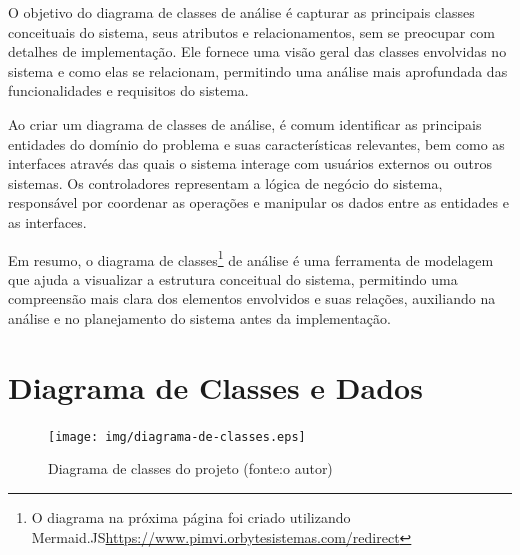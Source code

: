 \documentclass[
	12pt,				%
	openright,			%
	twoside,			%
	a4paper,			%
	english,			%
	brazil				%
	]{abntex2}
\begin{document}
O objetivo do diagrama de classes de análise é capturar as principais classes conceituais do sistema, seus atributos e relacionamentos, sem se preocupar com detalhes de implementação. Ele fornece uma visão geral das classes envolvidas no sistema e como elas se relacionam, permitindo uma análise mais aprofundada das funcionalidades e requisitos do sistema.

Ao criar um diagrama de classes de análise, é comum identificar as principais entidades do domínio do problema e suas características relevantes, bem como as interfaces através das quais o sistema interage com usuários externos ou outros sistemas. Os controladores representam a lógica de negócio do sistema, responsável por coordenar as operações e manipular os dados entre as entidades e as interfaces.

Em resumo, o diagrama de classes\footnote{O diagrama na próxima página foi criado utilizando Mermaid.JS\url{https://www.pimvi.orbytesistemas.com/redirect}} de análise é uma ferramenta de modelagem que ajuda a visualizar a estrutura conceitual do sistema, permitindo uma compreensão mais clara dos elementos envolvidos e suas relações, auxiliando na análise e no planejamento do sistema antes da implementação.

\clearpage

\section{Diagrama de Classes e Dados}\label{diagrama_de_classes}

\begin{figure}[htb] %
	\centering
	\texttt{[image: img/diagrama-de-classes.eps]}
	\caption{Diagrama de classes do projeto (fonte:o autor)} 
	\label{fig:diagrama_de_classes}
\end{figure}



\end{document}
